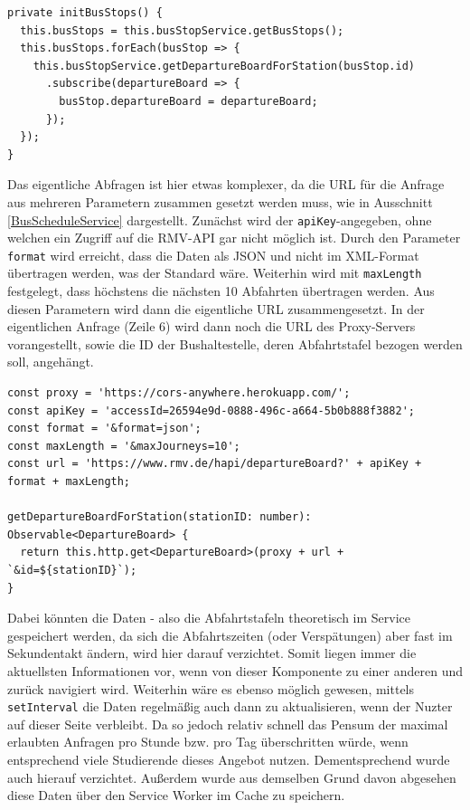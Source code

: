 \begin{lstlisting}[float, floatplacement=h, style=htmlcssjs, caption={Ausschnitt aus \texttt{BusStopComponent}}, label={busStopComponent}]
private initBusStops() {
  this.busStops = this.busStopService.getBusStops();
  this.busStops.forEach(busStop => {
    this.busStopService.getDepartureBoardForStation(busStop.id)
      .subscribe(departureBoard => {
        busStop.departureBoard = departureBoard;
      });
  });
}
\end{lstlisting}

Das eigentliche Abfragen ist hier etwas komplexer, da die \acs{URL} für die Anfrage aus mehreren Parametern zusammen gesetzt werden muss, wie in Ausschnitt \ref{BusScheduleService} dargestellt. Zunächst wird der \texttt{apiKey}-angegeben, ohne welchen ein Zugriff auf die RMV-API gar nicht möglich ist. Durch den Parameter \texttt{format} wird erreicht, dass die Daten als \acs{JSON} und nicht im \acs{XML}-Format übertragen werden, was der Standard wäre. Weiterhin wird mit \texttt{maxLength} festgelegt, dass höchstens die nächsten 10 Abfahrten übertragen werden. Aus diesen Parametern wird dann die eigentliche \acs{URL} zusammengesetzt. In der eigentlichen Anfrage (Zeile 6) wird dann noch die \acs{URL} des Proxy-Servers vorangestellt, sowie die ID der Bushaltestelle, deren Abfahrtstafel bezogen werden soll, angehängt.

\begin{lstlisting}[float, floatplacement=h, style=htmlcssjs, caption={Abfragen der Abfahrtstafeln im BusScheduleService}, label={BusScheduleService}]
const proxy = 'https://cors-anywhere.herokuapp.com/';
const apiKey = 'accessId=26594e9d-0888-496c-a664-5b0b888f3882';
const format = '&format=json';
const maxLength = '&maxJourneys=10';
const url = 'https://www.rmv.de/hapi/departureBoard?' + apiKey + format + maxLength;

getDepartureBoardForStation(stationID: number): Observable<DepartureBoard> {
  return this.http.get<DepartureBoard>(proxy + url + `&id=${stationID}`);
}
\end{lstlisting}
Dabei könnten die Daten - also die Abfahrtstafeln theoretisch im Service gespeichert werden, da sich die Abfahrtszeiten (oder Verspätungen) aber fast im Sekundentakt ändern, wird hier darauf verzichtet. Somit liegen immer die aktuellsten Informationen vor, wenn von dieser Komponente zu einer anderen und zurück navigiert wird. Weiterhin wäre es ebenso möglich gewesen, mittels \texttt{setInterval} die Daten regelmäßig auch dann zu aktualisieren, wenn der Nuzter auf dieser Seite verbleibt. Da so jedoch relativ schnell das Pensum der maximal erlaubten Anfragen pro Stunde bzw. pro Tag überschritten würde, wenn entsprechend viele Studierende dieses Angebot nutzen. Dementsprechend wurde auch hierauf verzichtet. Außerdem wurde aus demselben Grund davon abgesehen diese Daten über den Service Worker im Cache zu speichern.

